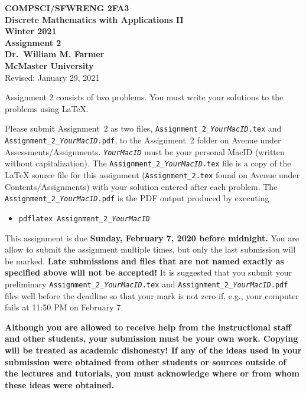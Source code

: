 \documentclass[11pt,fleqn]{article}
\begin{document}
\begin{center}

  {\large \textbf{COMPSCI/SFWRENG 2FA3}}\\[2mm]
  {\large \textbf{Discrete Mathematics with Applications II}}\\[2mm]
  {\large \textbf{Winter 2021}}\\[8mm]
  {\huge \textbf{Assignment 2}}\\[6mm]
  {\large \textbf{Dr.~William M. Farmer}}\\[2mm]
  {\large \textbf{McMaster University}}\\[6mm]
  {\large Revised: January 29, 2021}

\end{center}

\medskip

Assignment 2 consists of two problems.  You must write your solutions
to the problems using LaTeX.

Please submit Assignment~2 as two files,
\texttt{Assignment\_2\_\emph{YourMacID}.tex} and
\texttt{Assignment\_2\_\emph{YourMacID}.pdf}, to the Assignment~2
folder on Avenue under Assessments/Assignments.
\texttt{\emph{YourMacID}} must be your personal MacID (written without
capitalization).  The \texttt{Assignment\_2\_\emph{YourMacID}.tex}
file is a copy of the LaTeX source file for this assignment
(\texttt{Assignment\_2.tex} found on Avenue under
Contents/Assignments) with your solution entered after each problem.
The \texttt{Assignment\_2\_\emph{YourMacID}.pdf} is the PDF output
produced by executing

\begin{itemize}

  \item[] \texttt{pdflatex Assignment\_2\_\emph{YourMacID}}

\end{itemize}

This assignment is due \textbf{Sunday, February 7, 2020 before
  midnight.}  You are allow to submit the assignment multiple times,
but only the last submission will be marked.  \textbf{Late submissions
  and files that are not named exactly as specified above will not be
  accepted!}  It is suggested that you submit your preliminary
\texttt{Assignment\_2\_\emph{YourMacID}.tex} and
\texttt{Assignment\_2\_\emph{YourMacID}.pdf} files well before the
deadline so that your mark is not zero if, e.g., your computer fails
at 11:50 PM on February 7.

\textbf{Although you are allowed to receive help from the
  instructional staff and other students, your submission must be your
  own work.  Copying will be treated as academic dishonesty! If any of
  the ideas used in your submission were obtained from other students
  or sources outside of the lectures and tutorials, you must
  acknowledge where or from whom these ideas were obtained.}
\end{document}
